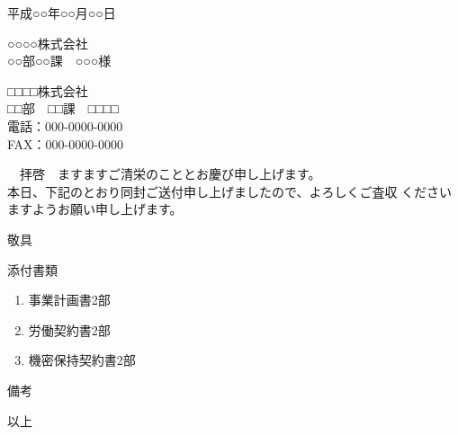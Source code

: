 \documentclass[a4j,12pt]{jarticle}
\begin{document}
\begin{flushright}
平成○○年○○月○○日
\end{flushright}

\begin{flushleft}
○○○○株式会社\\
○○部○○課　○○○様\\
\end{flushleft}

\begin{flushright}
□□□□株式会社\\          
□□部　□□課　□□□□\\
電話：000-0000-0000\\
FAX：000-0000-0000\\
\end{flushright}

\begin{center}
\underline{}
\end{center}

\begin{flushleft}
　拝啓　ますますご清栄のこととお慶び申し上げます。\\
本日、下記のとおり同封ご送付申し上げましたので、よろしくご査収
くださいますようお願い申し上げます。
\end{flushleft}
\begin{flushright}敬具\end{flushright}

\begin{flushleft}添付書類\end{flushleft}

\begin{enumerate}
\item 事業計画書\hspace{2cm}2部
\item 労働契約書\hspace{2cm}2部
\item 機密保持契約書\hspace{1.2cm}2部
\end{enumerate}

\begin{flushleft}備考\end{flushleft}

\begin{flushright}以上\end{flushright}
\end{document}
